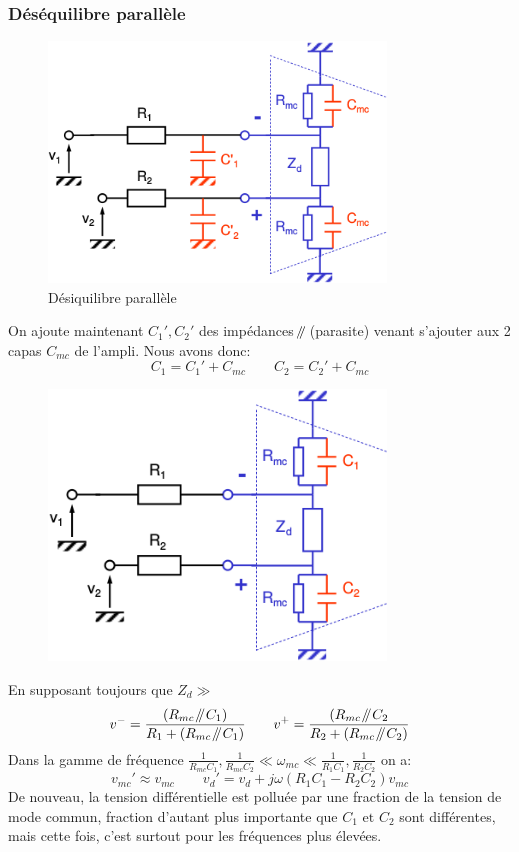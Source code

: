 \subsubsection{Déséquilibre parallèle}
\begin{figure}[H] 
	\centering 
	\includegraphics[width=0.8\textwidth,height=10\baselineskip,keepaspectratio]{ch3/image18} 
	\caption{Désiquilibre parallèle} 
\end{figure}
On ajoute maintenant \(C_1', C_2'\) des impédances \(\parallelsum\) (parasite) venant s'ajouter aux 2 capas \(C_{mc}\) de l'ampli. Nous avons donc:
\[C_1=C_1'+C_{mc}\qquad C_2=C_2'+C_{mc}\] 
\begin{figure}[H] 
	\centering 
	\includegraphics[width=0.8\textwidth,height=10\baselineskip,keepaspectratio]{ch3/image19}
\end{figure}
En supposant toujours que \(Z_d\gg\)
\[v^-=\frac{(R_{mc} \parallelsum C_1)}{R_1+(R_{mc} \parallelsum C_1)}\qquad v^+=\frac{(R_{mc} \parallelsum C_2}{R_2+(R_{mc} \parallelsum C_2)}\] 
Dans la gamme de fréquence \(\frac{1}{R_{mc}C_1},\frac{1}{R_{mc}C_2}\ll\omega_{mc}\ll\frac{1}{R_1C_1},\frac{1}{R_2C_2}\) on a:
\[v_{mc}'\approx v_{mc}\qquad v_d'=v_d+j\omega(R_1C_1-R_2C_2)v_{mc}\]
De nouveau, la tension différentielle est polluée par une fraction de la tension de mode commun, fraction d'autant plus importante que \(C_1\text{ et }C_2\) sont différentes, mais cette fois, c'est surtout pour les fréquences plus élevées.\\

